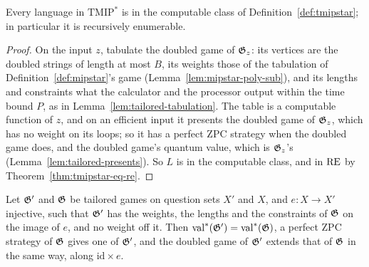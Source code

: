 \begin{lemma}
\label{lem:tmipstar-poly-sub}
\leanok
Every language in $\mathrm{TMIP}^*$ is in the computable class of Definition~\ref{def:tmipstar};
in particular it is recursively enumerable.
\end{lemma}

\begin{proof}
\leanok
On the input $z$, tabulate the doubled game of $\mathfrak{G}_z$: its vertices are the doubled strings of
length at most $B$, its weights those of the tabulation of Definition~\ref{def:mipstar}'s game
(Lemma~\ref{lem:mipstar-poly-sub}), and its lengths and constraints what the calculator and the
processor output within the time bound $P$, as in Lemma~\ref{lem:tailored-tabulation}. The table
is a computable function of $z$, and on an efficient input it presents the doubled game of
$\mathfrak{G}_z$, which has no weight on its loops; so it has a perfect ZPC strategy when the doubled
game does, and the doubled game's quantum value, which is $\mathfrak{G}_z$'s
(Lemma~\ref{lem:tailored-presents}). So $L$ is in the computable class, and in $\mathrm{RE}$ by
Theorem~\ref{thm:tmipstar-eq-re}.
\end{proof}

\begin{lemma}
\label{lem:tailored-extend}
\leanok
Let $\mathfrak{G}'$ and $\mathfrak{G}$ be tailored games on question sets $X'$ and $X$, and $e : X \to X'$
injective, such that $\mathfrak{G}'$ has the weights, the lengths and the constraints of $\mathfrak{G}$ on the
image of $e$, and no weight off it. Then $\mathrm{val}^*(\mathfrak{G}') = \mathrm{val}^*(\mathfrak{G})$, a perfect ZPC
strategy of $\mathfrak{G}$ gives one of $\mathfrak{G}'$, and the doubled game of $\mathfrak{G}'$ extends that of
$\mathfrak{G}$ in the same way, along $\mathrm{id} \times e$.
\end{lemma}

